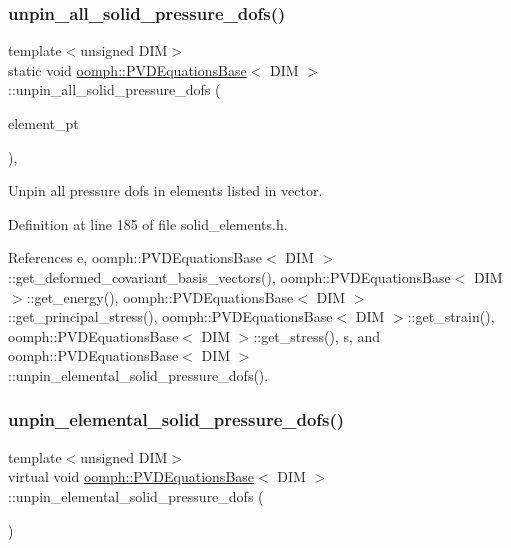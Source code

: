 \subsubsection{\texorpdfstring{unpin\+\_\+all\+\_\+solid\+\_\+pressure\+\_\+dofs()}{unpin\_all\_solid\_pressure\_dofs()}}
{\footnotesize\ttfamily template$<$unsigned D\+IM$>$ \\
static void \hyperlink{classoomph_1_1PVDEquationsBase}{oomph\+::\+P\+V\+D\+Equations\+Base}$<$ D\+IM $>$\+::unpin\+\_\+all\+\_\+solid\+\_\+pressure\+\_\+dofs (\begin{DoxyParamCaption}\item[{const \hyperlink{classoomph_1_1Vector}{Vector}$<$ \hyperlink{classoomph_1_1GeneralisedElement}{Generalised\+Element} $\ast$$>$ \&}]{element\+\_\+pt }\end{DoxyParamCaption})\hspace{0.3cm}{\ttfamily [inline]}, {\ttfamily [static]}}



Unpin all pressure dofs in elements listed in vector. 



Definition at line 185 of file solid\+\_\+elements.\+h.



References e, oomph\+::\+P\+V\+D\+Equations\+Base$<$ D\+I\+M $>$\+::get\+\_\+deformed\+\_\+covariant\+\_\+basis\+\_\+vectors(), oomph\+::\+P\+V\+D\+Equations\+Base$<$ D\+I\+M $>$\+::get\+\_\+energy(), oomph\+::\+P\+V\+D\+Equations\+Base$<$ D\+I\+M $>$\+::get\+\_\+principal\+\_\+stress(), oomph\+::\+P\+V\+D\+Equations\+Base$<$ D\+I\+M $>$\+::get\+\_\+strain(), oomph\+::\+P\+V\+D\+Equations\+Base$<$ D\+I\+M $>$\+::get\+\_\+stress(), s, and oomph\+::\+P\+V\+D\+Equations\+Base$<$ D\+I\+M $>$\+::unpin\+\_\+elemental\+\_\+solid\+\_\+pressure\+\_\+dofs().

\mbox{\label{classoomph_1_1PVDEquationsBase_abd9064a8651728806dda27636b1e5b50}} 
\subsubsection{\texorpdfstring{unpin\+\_\+elemental\+\_\+solid\+\_\+pressure\+\_\+dofs()}{unpin\_elemental\_solid\_pressure\_dofs()}}
{\footnotesize\ttfamily template$<$unsigned D\+IM$>$ \\
virtual void \hyperlink{classoomph_1_1PVDEquationsBase}{oomph\+::\+P\+V\+D\+Equations\+Base}$<$ D\+IM $>$\+::unpin\+\_\+elemental\+\_\+solid\+\_\+pressure\+\_\+dofs (\begin{DoxyParamCaption}{ }\end{DoxyParamCaption})\hspace{0.3cm}{\ttfamily [pure virtual]}}




